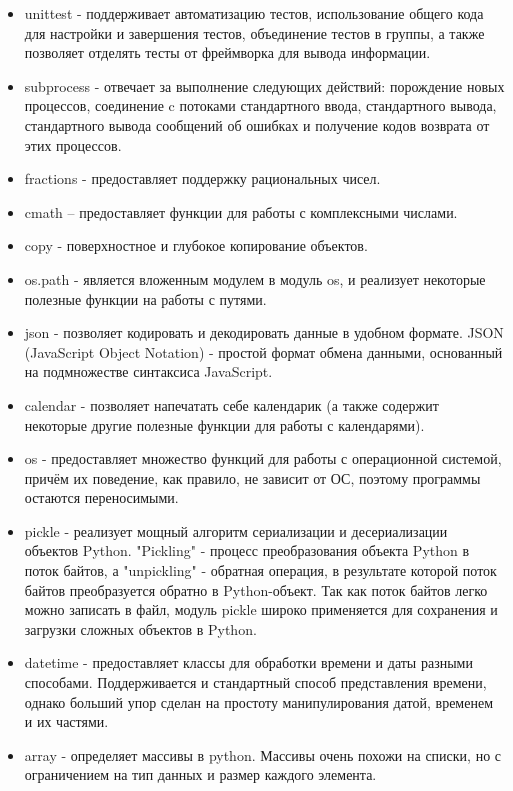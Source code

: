		\begin{itemize}
	
		\item unittest - поддерживает автоматизацию тестов, использование общего кода для настройки и завершения тестов, объединение тестов в группы, а также позволяет отделять тесты от фреймворка для вывода информации.
		\item subprocess - отвечает за выполнение следующих действий: порождение новых процессов, соединение c потоками стандартного ввода, стандартного вывода, стандартного вывода сообщений об ошибках и получение кодов возврата от этих процессов.
		\item fractions - предоставляет поддержку рациональных чисел.
		\item cmath – предоставляет функции для работы с комплексными числами.
		\item copy - поверхностное и глубокое копирование объектов.
		\item os.path - является вложенным модулем в модуль os, и реализует некоторые полезные функции на работы с путями.
		\item json - позволяет кодировать и декодировать данные в удобном формате. JSON (JavaScript Object Notation) - простой формат обмена данными, основанный на подмножестве синтаксиса JavaScript.
		\item calendar - позволяет напечатать себе календарик (а также содержит некоторые другие полезные функции для работы с календарями).
		\item os - предоставляет множество функций для работы с операционной системой, причём их поведение, как правило, не зависит от ОС, поэтому программы остаются переносимыми.
		\item pickle - реализует мощный алгоритм сериализации и десериализации объектов Python. "Pickling" - процесс преобразования объекта Python в поток байтов, а "unpickling" - обратная операция, в результате которой поток байтов преобразуется обратно в Python-объект. Так как поток байтов легко можно записать в файл, модуль pickle широко применяется для сохранения и загрузки сложных объектов в Python.
		\item datetime - предоставляет классы для обработки времени и даты разными способами. Поддерживается и стандартный способ представления времени, однако больший упор сделан на простоту манипулирования датой, временем и их частями.
		\item array - определяет массивы в python. Массивы очень похожи на списки, но с ограничением на тип данных и размер каждого элемента.

\end{itemize}
